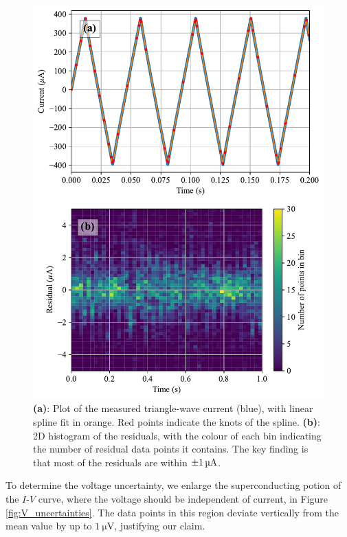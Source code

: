\documentclass[twocol]{ametsocV6.1}
\begin{document}
\begin{figure}[ht]
	\centering
	\includegraphics[width=\linewidth]{../figures/I_uncertainties.pdf}
	\caption{
		\textbf{(a)}: Plot of the measured triangle-wave current (blue),
		with linear spline fit in orange. Red points indicate the knots
		of the spline.
		\textbf{(b)}: 2D histogram of the residuals, with the colour of each
		bin indicating the number of residual data points it contains.
		The key finding is that most of the residuals are within
		$\SI{\pm 1}{\micro\ampere}$.
	}
	\label{fig:I_uncertainties}
\end{figure}

To determine the voltage uncertainty, we enlarge the superconducting potion
of the $I$-$V$ curve, where the voltage should be independent of current,
in Figure \ref{fig:V_uncertainties}. The data points in this region
deviate vertically from the mean value by up to $\SI{1}{\micro\volt}$,
justifying our claim.
\end{document}

